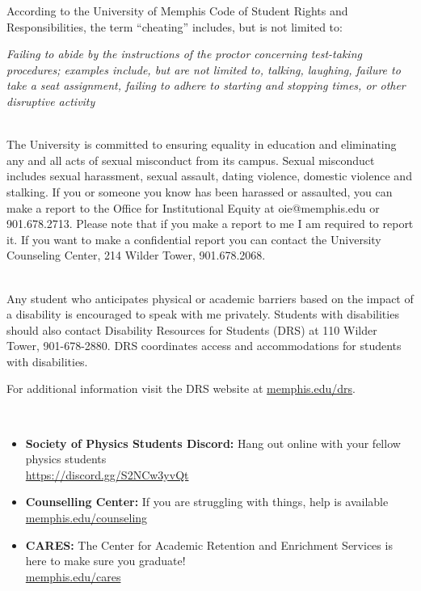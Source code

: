\documentclass[11pt]{article}
\begin{document}
According to the University of Memphis Code of Student Rights and
Responsibilities, the term ``cheating'' includes, but is not limited to:

\textit{Failing to abide by the instructions of the proctor concerning
test-taking procedures; examples include, but are not limited to, talking,
laughing, failure to take a seat assignment, failing to adhere to starting and
stopping times, or other disruptive activity}

\medskip{}\\ 
The University is committed to ensuring equality in education and eliminating
any and all acts of sexual misconduct from its campus. Sexual misconduct
includes sexual harassment, sexual assault, dating violence, domestic violence
and stalking. If you or someone you know has been harassed or assaulted, you can
make a report to the Office for Institutional Equity at oie@memphis.edu or
901.678.2713. Please note that if you make a report to me I am required to
report it. If you want to make a confidential report you can contact the
University Counseling Center, 214 Wilder Tower, 901.678.2068.

\medskip{}\\ 
Any student who anticipates physical or academic barriers based on the impact of a disability is encouraged to speak with me privately. Students with disabilities should also contact Disability Resources for Students (DRS) at 110 Wilder Tower, 901-678-2880. DRS coordinates access and accommodations for students with disabilities.

For additional information visit the DRS website at
\href{https://www.memphis.edu/drs/}{memphis.edu/drs}.


\medskip{}\\ 
\begin{itemize}
    \item \textbf{Society of Physics Students Discord:}
        Hang out online with your fellow physics students \\ \href{https://discord.gg/S2NCw3yvQt}{https://discord.gg/S2NCw3yvQt}
    \item \textbf{Counselling Center:} If you are struggling with things, help is
        available \\
        \href{https://www.memphis.edu/counseling/counseling/}{memphis.edu/counseling}
    \item \textbf{CARES:} The Center for Academic Retention and Enrichment
        Services is here to make sure you graduate! \\
        \href{https://www.memphis.edu/cares/}{memphis.edu/cares}
\end{itemize}
\end{document}

